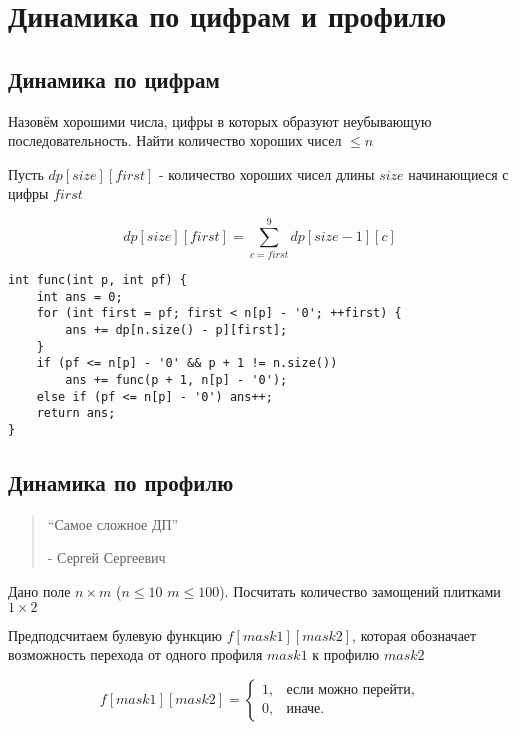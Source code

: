 \section{Динамика по цифрам и профилю}
\subsection{Динамика по цифрам}
\begin{problem}
    Назовём хорошими числа, цифры в которых образуют неубывающую последовательность.
    Найти количество хороших чисел $\leq n$
\end{problem}
Пусть $dp[size][first]$ - количество хороших чисел длины $size$ начинающиеся с цифры $first$

$$dp[size][first] = \sum_{c = first}^9 dp[size - 1][c]$$

\begin{verbatim}
int func(int p, int pf) {
    int ans = 0;
    for (int first = pf; first < n[p] - '0'; ++first) {
        ans += dp[n.size() - p][first];
    }
    if (pf <= n[p] - '0' && p + 1 != n.size())
        ans += func(p + 1, n[p] - '0');
    else if (pf <= n[p] - '0') ans++;
    return ans;
}
\end{verbatim}

\subsection{Динамика по профилю}

\begin{quote}
    ``Самое сложное ДП''
    \begin{flushright}
        - Сергей Сергеевич
    \end{flushright}
\end{quote}

\begin{problem}
    Дано поле $n \times m$ ($n \leq 10$ $m \leq 100$).
    Посчитать количество замощений плитками $1 \times 2$
\end{problem}

Предподсчитаем булевую функцию $f[mask1][mask2]$, которая обозначает возможность перехода от одного профиля $mask1$ к профилю $mask2$

$$
    f[mask1][mask2] =
    \begin{cases}
        1,&\text{если можно перейти},\\
        0,&\text{иначе}.
    \end{cases}
$$


